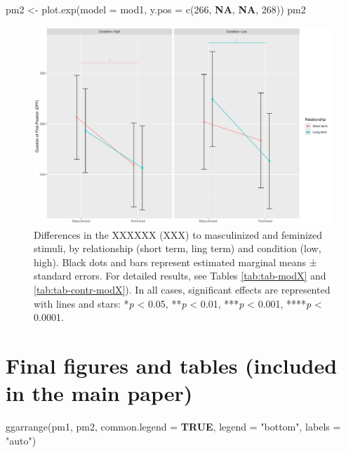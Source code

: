 \documentclass[
  bookmarksnumbered]{article}
\newenvironment{Shaded}{\begin{snugshade}}{\end{snugshade}}
\newcommand{\AttributeTok}[1]{\textcolor[rgb]{0.80,0.80,0.80}{#1}}
\newcommand{\ConstantTok}[1]{\textcolor[rgb]{0.86,0.64,0.64}{\textbf{#1}}}
\newcommand{\DecValTok}[1]{\textcolor[rgb]{0.86,0.86,0.80}{#1}}
\newcommand{\FunctionTok}[1]{\textcolor[rgb]{0.94,0.94,0.56}{#1}}
\newcommand{\NormalTok}[1]{\textcolor[rgb]{0.80,0.80,0.80}{#1}}
\newcommand{\OtherTok}[1]{\textcolor[rgb]{0.94,0.94,0.56}{#1}}
\newcommand{\StringTok}[1]{\textcolor[rgb]{0.80,0.58,0.58}{#1}}
\begin{document}
\begin{Shaded}
\begin{Highlighting}[]
\NormalTok{pm2 }\OtherTok{\textless{}{-}} \FunctionTok{plot.exp}\NormalTok{(}\AttributeTok{model =}\NormalTok{ mod1, }\AttributeTok{y.pos =} \FunctionTok{c}\NormalTok{(}\DecValTok{266}\NormalTok{, }\ConstantTok{NA}\NormalTok{, }\ConstantTok{NA}\NormalTok{, }\DecValTok{268}\NormalTok{))}
\NormalTok{pm2}
\end{Highlighting}
\end{Shaded}

\begin{figure}
\centering
\includegraphics{Supplementary_material_files/figure-latex/fig-mod1X-1.pdf}
\caption{\label{fig:fig-mod1X}Differences in the XXXXXX (XXX) to masculinized and feminized stimuli, by relationship (short term, ling term) and condition (low, high). Black dots and bars represent estimated marginal means ± standard errors. For detailed results, see Tables \ref{tab:tab-modX} and \ref{tab:tab-contr-modX}). In all cases, significant effects are represented with lines and stars: *\emph{p} \textless{} 0.05, **\emph{p} \textless{} 0.01, ***\emph{p} \textless{} 0.001, ****\emph{p} \textless{} 0.0001.}
\end{figure}

\closesupplement

\section{Final figures and tables (included in the main paper)}\label{final-figures-and-tables-included-in-the-main-paper}

\begin{Shaded}
\begin{Highlighting}[]
\FunctionTok{ggarrange}\NormalTok{(pm1, pm2,}
          \AttributeTok{common.legend =} \ConstantTok{TRUE}\NormalTok{,}
          \AttributeTok{legend =} \StringTok{"bottom"}\NormalTok{,}
          \AttributeTok{labels =} \StringTok{"auto"}\NormalTok{)}
\end{Highlighting}
\end{Shaded}
\end{document}
